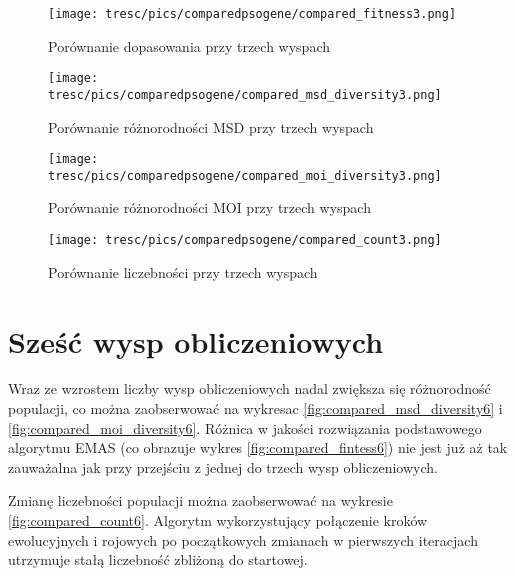 \begin{figure}[H]
\begin{center} 
\texttt{[image: tresc/pics/comparedpsogene/compared\_fitness3.png]}
\caption{Porównanie dopasowania przy trzech wyspach}
\label{fig:compared_fintess3}
\end{center}
\end{figure}

\clearpage

\begin{figure}[H]
\begin{center} 
\texttt{[image: tresc/pics/comparedpsogene/compared\_msd\_diversity3.png]}
\caption{Porównanie różnorodności MSD przy trzech wyspach}
\label{fig:compared_msd_diversity3}
\end{center}
\end{figure}

\begin{figure}[H]
\begin{center} 
\texttt{[image: tresc/pics/comparedpsogene/compared\_moi\_diversity3.png]}
\caption{Porównanie różnorodności MOI przy trzech wyspach}
\label{fig:compared_moi_diversity3}
\end{center}
\end{figure}

\begin{figure}[H]
\begin{center} 
\texttt{[image: tresc/pics/comparedpsogene/compared\_count3.png]}
\caption{Porównanie liczebności przy trzech wyspach}
\label{fig:compared_count3}
\end{center}
\end{figure}


\section{Sześć wysp obliczeniowych}

Wraz ze wzrostem liczby wysp obliczeniowych nadal zwiększa się różnorodność populacji, co można zaobserwować na wykresac \ref{fig:compared_msd_diversity6} i \ref{fig:compared_moi_diversity6}. Różnica w jakości rozwiązania podstawowego algorytmu EMAS (co obrazuje wykres \ref{fig:compared_fintess6}) nie jest już aż tak zauważalna jak przy przejściu z jednej do trzech wysp obliczeniowych. 

Zmianę liczebności populacji można zaobserwować na wykresie \ref{fig:compared_count6}. Algorytm wykorzystujący połączenie kroków ewolucyjnych i rojowych po początkowych zmianach w pierwszych iteracjach utrzymuje stałą liczebność zbliżoną do startowej.

